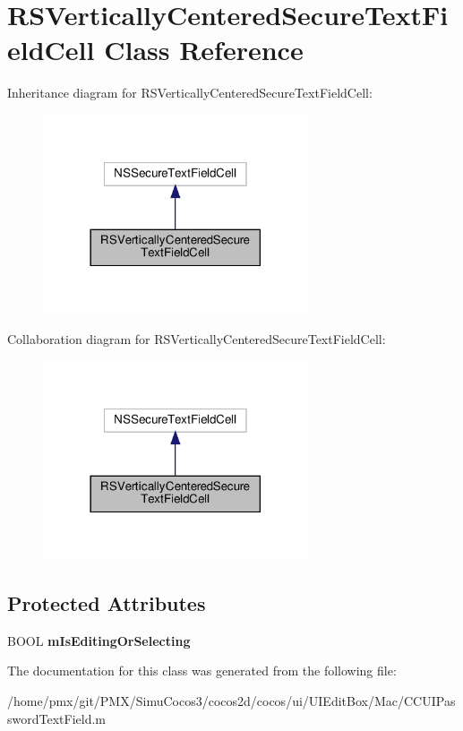 \hypertarget{interfaceRSVerticallyCenteredSecureTextFieldCell}{}\section{R\+S\+Vertically\+Centered\+Secure\+Text\+Field\+Cell Class Reference}
\label{interfaceRSVerticallyCenteredSecureTextFieldCell}


Inheritance diagram for R\+S\+Vertically\+Centered\+Secure\+Text\+Field\+Cell\+:
\nopagebreak
\begin{figure}[H]
\begin{center}
\leavevmode
\includegraphics[width=222pt]{interfaceRSVerticallyCenteredSecureTextFieldCell__inherit__graph}
\end{center}
\end{figure}


Collaboration diagram for R\+S\+Vertically\+Centered\+Secure\+Text\+Field\+Cell\+:
\nopagebreak
\begin{figure}[H]
\begin{center}
\leavevmode
\includegraphics[width=222pt]{interfaceRSVerticallyCenteredSecureTextFieldCell__coll__graph}
\end{center}
\end{figure}
\subsection*{Protected Attributes}
\begin{DoxyCompactItemize}
\item 
\mbox{\label{interfaceRSVerticallyCenteredSecureTextFieldCell_a73c6fe94e40a034f3151bb2968359161}} 
B\+O\+OL {\bfseries m\+Is\+Editing\+Or\+Selecting}
\end{DoxyCompactItemize}


The documentation for this class was generated from the following file\+:\begin{DoxyCompactItemize}
\item 
/home/pmx/git/\+P\+M\+X/\+Simu\+Cocos3/cocos2d/cocos/ui/\+U\+I\+Edit\+Box/\+Mac/C\+C\+U\+I\+Password\+Text\+Field.\+m\end{DoxyCompactItemize}
